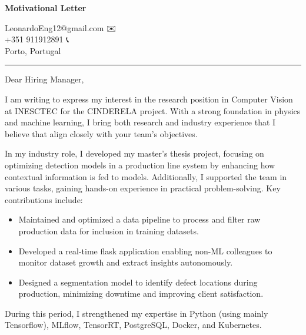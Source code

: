 \documentclass[11pt,a4paper]{article}
\title{}
\author{}
\date{}
\begin{document}
	
	\noindent
	\begin{minipage}[b]{0.48\textwidth}
		\raggedright
		\textbf{Motivational Letter}
	\end{minipage}%
	\hfill
	\begin{minipage}[b]{0.48\textwidth}
		\raggedleft
		LeonardoEng12@gmail.com {\emoji ✉️}\\
		+351 911912891 {\emoji 📞} \\
		Porto, Portugal {\emoji 📍}
	\end{minipage}
	\vspace{5pt}
	\hrule
	
	\vspace{1em}
	
	\noindent Dear Hiring Manager,
	
	\vspace{1em}
	
	\noindent I am writing to express my interest in the research position in Computer Vision at INESCTEC for the CINDERELA project. With a strong foundation in physics and machine learning, I bring both research and industry experience that I believe that align closely with your team’s objectives.
	
	\vspace{1em}
	
	\noindent \noindent In my industry role, I developed my master’s thesis project, focusing on optimizing detection models in a production line system by enhancing how contextual information is fed to models. Additionally, I supported the team in various tasks, gaining hands-on experience in practical problem-solving. Key contributions include:
	\begin{itemize}
		\item Maintained and optimized a data pipeline to process and filter raw production data for inclusion in training datasets. 
		\item Developed a real-time flask application enabling non-ML colleagues to monitor dataset growth and extract insights autonomously.
		\item Designed a segmentation model to identify defect locations during production, minimizing downtime and improving client satisfaction.
	\end{itemize}
	\vspace{-8pt}
	During this period, I strengthened my expertise in Python (using mainly Tensorflow), MLflow, TensorRT, PostgreSQL, Docker, and Kubernetes.
	
\end{document}
